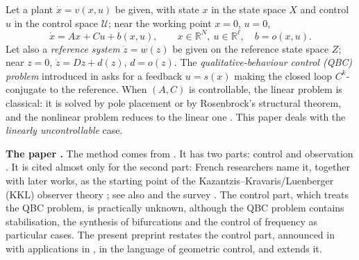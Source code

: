 \documentclass[11pt,reqno]{amsart}
\theoremstyle{plain}
\theoremstyle{remark}
\theoremstyle{definition}
\newcommand{\R}{\mathbb{R}}
\begin{document}
Let a plant $\dot x=v(x,u)$ be given, with state $x$ in the state space $X$ and control $u$ in the control
space $\mathcal U$; near the working point $x=0$, $u=0$,
\begin{equation}\label{eq:plant}
  \dot x = A x + C u + b(x,u), \qquad x\in\R^{N},\ u\in\R^{\ell},\quad b=o(x,u).
\end{equation}
Let also a \emph{reference system} $\dot z=w(z)$ be given on the reference state space $Z$; near $z=0$,
$\dot z=Dz+d(z)$, $d=o(z)$.
The \emph{qualitative-behaviour control (QBC) problem} introduced in \cite{Shosh1988,Shosh1990} asks for a feedback $u=s(x)$ making the closed loop
$C^{k}$-conjugate to the reference. When $(A,C)$ is controllable, the linear problem is classical: it is solved by pole placement or by Rosenbrock's
structural theorem, and the nonlinear problem reduces to the linear one \cite[Thm.~2.5]{Shosh1990}. This paper
deals with the \emph{linearly uncontrollable} case.

\medskip
\noindent\textbf{The paper \cite{Shosh1990}.} The method comes from \cite{Shosh1988,Shosh1990}. It has
two parts: control \cite[\S2--\S5]{Shosh1990} and observation \cite[\S6]{Shosh1990}. It is cited almost only for the second part: French researchers
name it, together with later works, as the starting point of the Kazantzis--Kravaris/Luenberger (KKL) observer
theory \cite{BrivadisAndrieuBernardSerres2023}; see also \cite{Andrieu2014} and the survey \cite{BernardAndrieuAstolfi2022}. The control part, which treats the QBC
problem, is practically unknown, although the QBC problem contains stabilisation, the synthesis of bifurcations and
the control of frequency as particular cases. The present preprint restates the control part, announced in \cite{Shosh1988} with applications in
\cite{Shosh1991,Shosh1992}, in the language of geometric control, and extends it.
\end{document}
